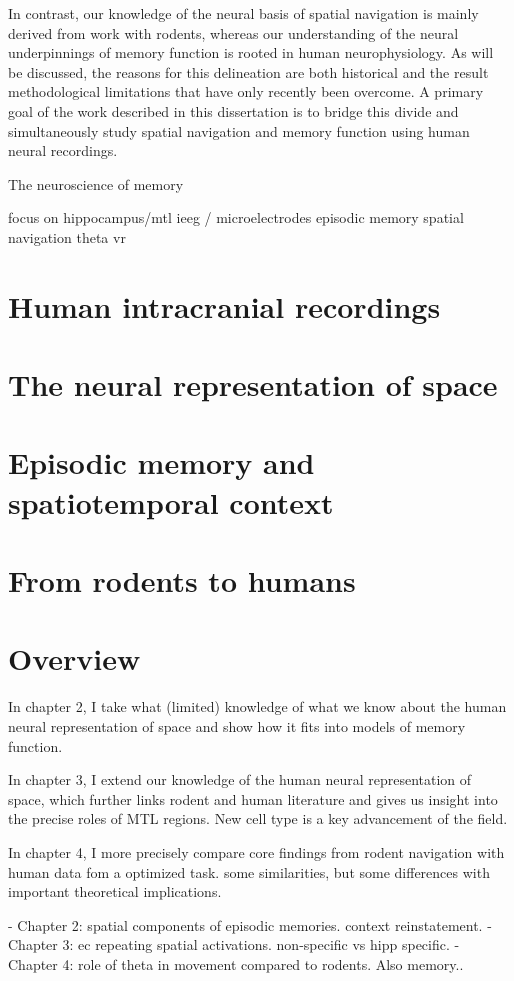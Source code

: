 In contrast, our knowledge of the neural basis of spatial navigation is mainly derived from work with rodents, whereas our understanding of the neural underpinnings of memory function is rooted in human neurophysiology. As will be discussed, the reasons for this delineation are both historical and the result methodological limitations that have only recently been overcome. A primary goal of the work described in this dissertation is to bridge this divide and simultaneously study spatial navigation and memory function using human neural recordings.

The neuroscience of memory 



focus on hippocampus/mtl
ieeg / microelectrodes
episodic memory
spatial navigation
theta
vr




\section{Human intracranial recordings}



\section{The neural representation of space}
\section{Episodic memory and spatiotemporal context}
\section{From rodents to humans}
\section{Overview}

In chapter 2, I take what (limited) knowledge of what we know about the human neural representation of space and show how it fits into models of memory function.

In chapter 3, I extend our knowledge of the human neural representation of space, which further links rodent and human literature and gives us insight into the precise roles of MTL regions. New cell type is a key advancement of the field.

In chapter 4, I more precisely compare core findings from rodent navigation with human data fom a optimized task. some similarities, but some differences with important theoretical implications.

- Chapter 2: spatial components of episodic memories. context reinstatement.
- Chapter 3: ec repeating spatial activations. non-specific vs hipp specific.
- Chapter 4: role of theta in movement compared to rodents. Also memory..
